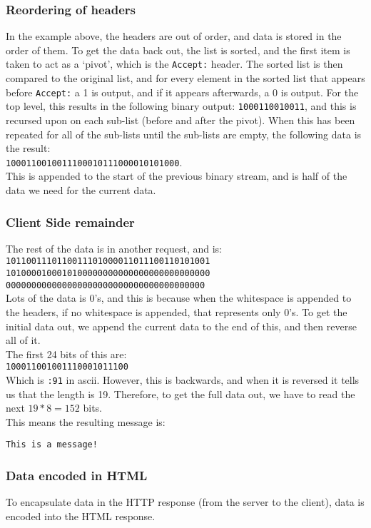 \subsubsection{Reordering of headers}
In the example above, the headers are out of order, and data is stored in the order of them.
To get the data back out, the list is sorted, and the first item is taken to act as a `pivot', which is the \texttt{Accept:} header.
The sorted list is then compared to the original list, and for every element in the sorted list that appears before \texttt{Accept:} a 1 is output, and if it appears afterwards, a 0 is output.
For the top level, this results in the following binary output: \texttt{1000110010011}, and this is recursed upon on each sub-list (before and after the pivot).
When this has been repeated for all of the sub-lists until the sub-lists are empty, the following data is the result:\\
\texttt{1000110010011100010111000010101000}.\\
This is appended to the start of the previous binary stream, and is half of the data we need for the current data.
\subsubsection{Client Side remainder}
The rest of the data is in another request, and is:\\
\texttt{1011001110110011101000011011100110101001\\
1010000100010100000000000000000000000000\\
000000000000000000000000000000000000000}\\
Lots of the data is 0's, and this is because when the whitespace is appended to the headers, if no whitespace is appended, that represents only 0's.
To get the initial data out, we append the current data to the end of this, and then reverse all of it.\\
The first 24 bits of this are:\\
\texttt{100011001001110001011100}\\
Which is \texttt{:91} in ascii. However, this is backwards, and when it is reversed it tells us that the length is 19. Therefore, to get the full data out, we have to read the next $19 * 8 = 152$ bits.\\
This means the resulting message is:\par
\texttt{This is a message!}

\newpage
\subsubsection{Data encoded in HTML}
To encapsulate data in the HTTP response (from the server to the client), data is encoded into the HTML response.

